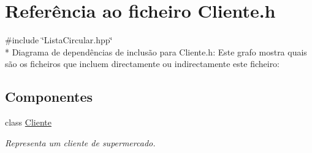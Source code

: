 \hypertarget{a00010}{\section{Referência ao ficheiro Cliente.\+h}
\label{a00010}
}
{\ttfamily \#include \char`\"{}Lista\+Circular.\+hpp\char`\"{}}\\*
Diagrama de dependências de inclusão para Cliente.\+h\+:
Este grafo mostra quais são os ficheiros que incluem directamente ou indirectamente este ficheiro\+:
\subsection*{Componentes}
\begin{DoxyCompactItemize}
\item 
class \hyperlink{a00002}{Cliente}
\begin{DoxyCompactList}\small\item\em Representa um cliente de supermercado. \end{DoxyCompactList}\end{DoxyCompactItemize}

